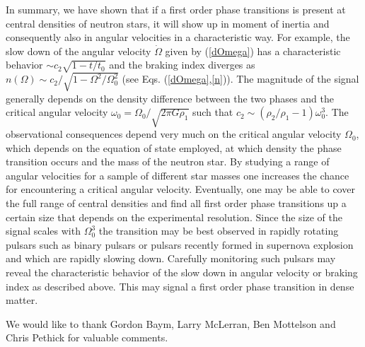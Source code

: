 \begin{multicols}{2}
In summary, we have shown that if a first order phase transitions is
present at central densities of neutron stars, it will show up in
moment of inertia and consequently also in angular velocities in a
characteristic way.
For example, the slow down of the angular velocity $\dot{\Omega}$
given by (\ref{dOmega}) has a characteristic behavior $\sim
c_2\sqrt{1-t/t_0}$ and the braking index diverges as $n(\Omega)\sim
c_2/\sqrt{1-\Omega^2/\Omega_0^2}$ (see Eqs. (\ref{dOmega},\ref{n})).
 The magnitude of the signal
generally depends on the density difference between the two phases and
the critical angular velocity $\omega_0=\Omega_0/\sqrt{2\pi G\rho_1}$
such that $c_2\sim(\rho_2/\rho_1-1)\omega_0^3$.
The observational consequences depend very much on the critical
angular velocity $\Omega_0$, which depends on the equation of state
employed, at which density the phase transition occurs and the mass of
the neutron star. By studying a range of angular velocities for a
sample of different star masses one increases the chance for
encountering a critical angular velocity. Eventually, one may be able
to cover the full range of central densities and find all first order
phase transitions up a certain size that depends on the experimental
resolution. 
Since the size of the signal scales with $\Omega_0^3$
the transition may be best observed in rapidly rotating pulsars such
as binary pulsars or pulsars recently formed in supernova explosion
and which are rapidly slowing down. Carefully monitoring such pulsars
may reveal the characteristic behavior of the slow down in angular
velocity or braking index as described above. This may signal a first
order phase transition in dense matter.

\acknowledgments
We would like to thank Gordon Baym, Larry McLerran, Ben Mottelson and
Chris Pethick for valuable comments.

\begin{references} 


\end{references}
\end{multicols}
